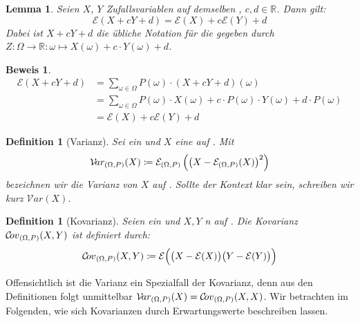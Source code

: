 \documentclass[a4paper]{article}
\newtheorem{lemma}[satz]{Lemma}
\newtheorem{definition}[satz]{Definition} %
\theoremstyle{nonumberplain}
\newtheorem{beweis}{Beweis}
\begin{document}
\begin{lemma} \label{lem-explin}
 Seien $X$, $Y$ Zufallsvariablen auf demselben \probspace{}, $c,d \in \mathbb{R}$. Dann gilt:
\begin{equation}
		\mathcal{E}(X + cY + d) = \mathcal{E}(X) + c \mathcal{E}(Y) + d \label{eq-linearity}
\end{equation}
Dabei ist  $X + cY + d$ die übliche Notation für die \rvar{} gegeben durch $Z : \Omega \to \mathbb{R} : \omega \mapsto X(\omega) + c \cdot Y(\omega)+ d$.
\end{lemma}
\begin{beweis}
\begin{align}
	\mathcal{E}(X + cY + d) & = \sum_{\omega \in \Omega}{P(\omega) \cdot (X + cY + d)(\omega) } \nonumber \\
	& = \sum_{\omega \in \Omega}{P(\omega) \cdot X(\omega) + c \cdot P(\omega) \cdot Y(\omega) + d \cdot P(\omega)} \nonumber \\
	& = \mathcal{E}(X) + c \mathcal{E}(Y) + d \nonumber
\end{align}
\end{beweis}
\newcommand{\var}{Varianz}
\newcommand{\mvar}{\mathcal{V}\!ar}
\begin{definition}[\var]\label{def-var}
	Sei \probspaceex{} ein \probspace{} und $X$ eine \rvar{} auf \probspaceex{}. Mit
	\begin{equation}
		\mvar_{\probspaceexraw{}}(X) \coloneqq  \mathcal{E}_{\probspaceexraw{}}\left(\left(X - \mathcal{E}_{\probspaceexraw{}} (X)\right)^{2}\right)
	\end{equation}
	bezeichnen wir die \var{} von $X$ auf  \probspaceex{}. Sollte der Kontext \probspaceex{} klar sein, schreiben wir kurz $\mvar(X)$.
\end{definition}
\newcommand{\cov}{Kovarianz}
\newcommand{\mcov}{\mathcal{C}\!ov}
\begin{definition}[\cov]\label{def-cov}
	Seien \probspaceex{} ein \probspace{} und $X, Y$ \rvar n auf \probspaceex{}. Die \cov{} $\mcov{}_{\probspaceexraw}(X,Y)$ ist definiert durch:
	\begin{equation}
		\mcov{}_{\probspaceexraw}(X,Y) \coloneqq \mathcal{E} \Big( \big(X - \mathcal{E}(X)\big)\big(Y - \mathcal{E}(Y) \big)\Big)
	\end{equation}
\end{definition}

Offensichtlich ist die \var{} ein Spezialfall der \cov{}, denn aus den Definitionen folgt unmittelbar $\mvar_{\probspaceexraw}(X) = \mcov{}_{\probspaceexraw}(X,X)$. Wir betrachten im Folgenden, wie sich Kovarianzen durch Erwartungswerte beschreiben lassen.
\end{document}
